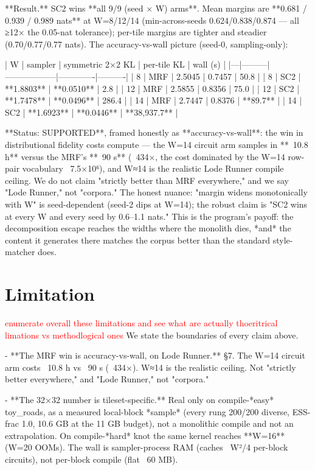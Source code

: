 \documentclass[letterpaper]{article} %
\newcommand{\todo}[1]{\textcolor{red}{#1}}
\begin{document}
**Result.** SC2 wins **all 9/9 (seed × W) arms**. Mean margins are **0.681 / 0.939 / 0.989 nats** at
W=8/12/14 (min-across-seeds 0.624/0.838/0.874 — all ≥12× the 0.05-nat tolerance); per-tile margins
are tighter and steadier (0.70/0.77/0.77 nats). The accuracy-vs-wall picture (seed-0, sampling-only):

| W | sampler | symmetric 2×2 KL | per-tile KL | wall (s) |
|---|---------|------------------|-------------|----------|
| 8 | MRF | 2.5045 | 0.7457 | 50.8 |
| 8 | SC2 | **1.8803** | **0.0510** | 2.8 |
| 12 | MRF | 2.5855 | 0.8356 | 75.0 |
| 12 | SC2 | **1.7478** | **0.0496** | 286.4 |
| 14 | MRF | 2.7447 | 0.8376 | **89.7** |
| 14 | SC2 | **1.6923** | **0.0446** | **38,937.7** |

**Status: SUPPORTED**, framed honestly as **accuracy-vs-wall**: the win in distributional fidelity
costs compute — the W=14 circuit arm samples in **~10.8 h** versus the MRF's **~90 s** (~434×, the
cost dominated by the W=14 row-pair vocabulary ~7.5×10⁶), and W≈14 is the realistic Lode Runner
compile ceiling. We do not claim "strictly better than MRF everywhere," and we say "Lode Runner," not
"corpora." The honest nuance: "margin widens monotonically with W" is seed-dependent (seed-2 dips at
W=14); the robust claim is "SC2 wins at every W and every seed by 0.6–1.1 nats." This is the program's
payoff: the decomposition escape reaches the widths where the monolith dies, *and* the content it
generates there matches the corpus better than the standard style-matcher does.


\section{Limitation}

\todo{enumerate overall these limitations and see what are actually thoeritrical limations vs methodlogical ones}
We state the boundaries of every claim above.

- **The MRF win is accuracy-vs-wall, on Lode Runner.** §7. The W=14 circuit arm costs ~10.8 h vs ~90 s
  (~434×). W≈14 is the realistic ceiling. Not "strictly better everywhere," and "Lode Runner," not
  "corpora."

- **The 32×32 number is tileset-specific.** Real only on compile-*easy* toy_roads, as a measured
  local-block *sample* (every rung 200/200 diverse, ESS-frac 1.0, 10.6 GB at the 11 GB budget), not a
  monolithic compile and not an extrapolation. On compile-*hard* knot the same kernel reaches **W=16**
  (W=20 OOMs). The wall is sampler-process RAM (caches ~W²/4 per-block circuits), not per-block
  compile (flat ~60 MB).
\end{document}
